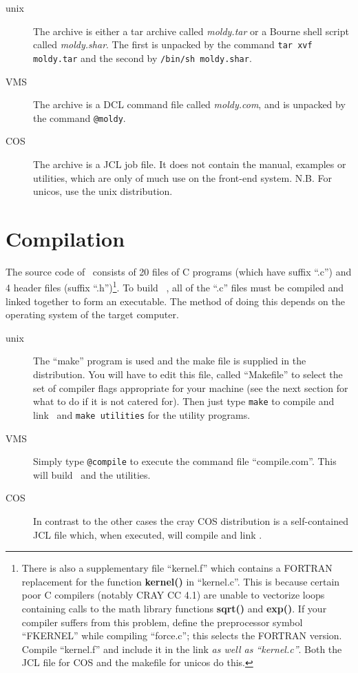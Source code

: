 \begin{description}
\item[unix]  The archive is either a tar archive called {\em
moldy.tar} or a Bourne shell script called {\em moldy.shar}. The first
is unpacked by the command \verb+tar xvf moldy.tar+ and the second by
\verb+/bin/sh moldy.shar+.

\item[VMS]  The archive is a DCL command file called {\em moldy.com},
and is unpacked by the command \verb'@moldy'.

\item[COS]  The archive is a JCL job file. It does not contain the
manual, examples or utilities, which are only of much use on the
front-end system.  N.B.  For unicos, use the unix distribution.
\end{description}


\section{Compilation}
The source code of \moldy\  consists of 20 files of C programs (which have
suffix ``.c'') and 4 header files (suffix ``.h'')\footnote{There is
also a supplementary file ``kernel.f'' which contains a FORTRAN
replacement for the function {\bf kernel()} in ``kernel.c''. This is
because certain poor C compilers (notably CRAY CC 4.1) are unable
to vectorize loops containing calls to the math library functions {\bf
sqrt()} and {\bf exp()}.  If your compiler suffers from this problem,
define the preprocessor symbol ``FKERNEL'' while compiling
``force.c''; this selects the FORTRAN version. Compile ``kernel.f''
and include it in the link {\em as well as ``kernel.c''}.  Both the
JCL file for COS and the makefile for unicos do this.}.
To build \moldy\ , all of the ``.c'' files must be compiled and linked
together to form an executable.  The method of doing this depends on
the operating system of the target computer.
\begin{description}
\item[unix]  The ``make'' program is used and the make file is
supplied in the distribution.  You will have to edit this file, called
``Makefile'' to select the  set of compiler flags appropriate for your
machine (see the next section for what to do if it is not catered
for). Then just type \verb'make' to compile and link \moldy\  and
\verb'make utilities' for the utility programs.

\item[VMS]  Simply type \verb'@compile' to execute the command file
``compile.com''. This will build \moldy\  and the utilities.

\item[COS]  In contrast to the other cases the cray COS distribution
is a self-contained JCL  file which, when executed, will compile and
link \moldy. 
\end{description}

